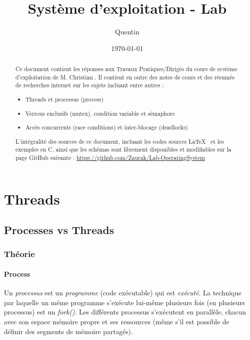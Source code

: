\documentclass[a4paper, 12pt]{article}
\begin{document}
 
\title{Système d'exploitation - Lab}
\author{Quentin }

\date{\today} 
 
\maketitle
\vfill
\begin{abstract}
	Ce document contient les réponses aux Travaux Pratiques/Dirigés du cours de système d'exploitation de M. Christian . Il contient en outre des notes de cours et des résumés de recherches internet sur les sujets incluant entre autres :
	\begin{itemize}
        \item Threads et processus (process)
        \item Verrous exclusifs (mutex), condition variable et sémaphore
        \item Accès concurrents (race conditions) et inter-blocage (deadlocks)
	\end{itemize}
	\bigskip
	L'intégralité des sources de ce document, incluant les codes sources \LaTeX~ et les exemples en C, ainsi que les schémas sont librement disponibles et modifiables sur la page GitHub suivante :	
	\url{https://github.com/Zaurak/Lab-OperatingSystem}
\end{abstract}
\vfill
\newpage

\tableofcontents
\newpage


\section{Threads}

\subsection{Processes vs Threads}

\subsubsection{Théorie}

\paragraph{Process\\}
Un \emph{processus} est un \emph{programme} (code exécutable) qui est \emph{exécuté}. La technique par laquelle un même programme s'exécute lui-même plusieurs fois (en plusieurs processus) est un \emph{fork()}. Les différents processus s'exécutent en parallèle, chacun avec son espace mémoire propre et ses ressources (même s'il est possible de définir des segments de mémoire partagés).
\end{document}
